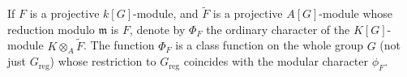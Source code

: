 If $F$ is a projective $k[G]$-module, and $\tilde{F}$ is a projective $A[G]$-module whose reduction modulo $\mathfrak{m}$ is $F$, denote by $\Phi_F$ the ordinary character of the $K[G]$-module $K \otimes_A \tilde{F}$. The function $\Phi_F$ is a class function on the whole group $G$ (not just $G_{\text{reg}}$) whose restriction to $G_{\text{reg}}$ coincides with the modular character $\phi_F$.
